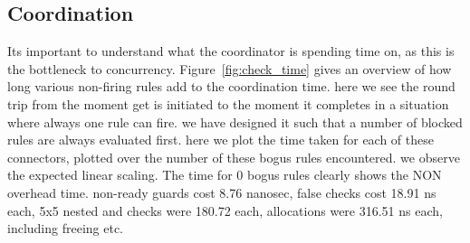 \subsection{Coordination}
Its important to understand what the coordinator is spending time on, as this is the bottleneck to concurrency. 
Figure~\ref{fig:check_time} gives an overview of how long various non-firing rules add to the coordination time. here we see the round trip from the moment get is initiated to the moment it completes in a situation where always one rule can fire. we have designed it such that a number of blocked rules are always evaluated first. here we plot the time taken for each of these connectors, plotted over the number of these bogus rules encountered. we observe the expected linear scaling. The time for 0 bogus rules clearly shows the NON overhead time. non-ready guards cost 8.76 nanosec, false checks cost 18.91 ns each, 5x5 nested and checks were 180.72 each, allocations were 316.51 ns each, including freeing etc. 
